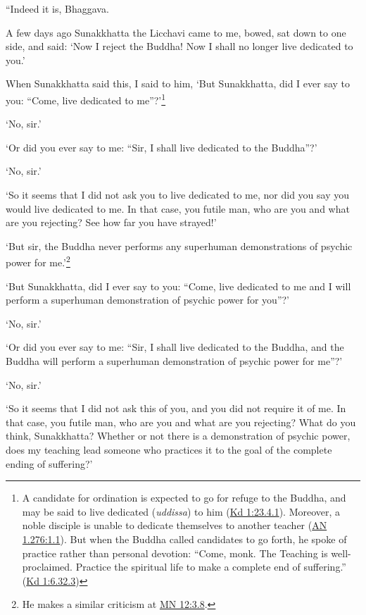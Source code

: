\documentclass[12pt,openany]{book}%
\begin{document}
“Indeed it is, Bhaggava. 

A few days ago Sunakkhatta the Licchavi came to me, bowed, sat down to one side, and said: ‘Now I reject the Buddha! Now I shall no longer live dedicated to you.’ 

When Sunakkhatta said this, I said to him, ‘But Sunakkhatta, did I ever say to you: “Come, live dedicated to me”?’\footnote{A candidate for ordination is expected to go for refuge to the Buddha, and may be said to live dedicated (\textit{uddissa}) to him (\href{https://suttacentral.net/pli-tv-kd1/en/sujato\#23.4.1}{Kd 1:23.4.1}). Moreover, a noble disciple is unable to dedicate themselves to another teacher (\href{https://suttacentral.net/an1.276/en/sujato\#1.1}{AN 1.276:1.1}). But when the Buddha called candidates to go forth, he spoke of practice rather than personal devotion: “Come, monk. The Teaching is well-proclaimed. Practice the spiritual life to make a complete end of suffering.” (\href{https://suttacentral.net/pli-tv-kd1/en/sujato\#6.32.3}{Kd 1:6.32.3}) } 

‘No, sir.’ 

‘Or did you ever say to me: “Sir, I shall live dedicated to the Buddha”?’ 

‘No, sir.’ 

‘So it seems that I did not ask you to live dedicated to me, nor did you say you would live dedicated to me. In that case, you futile man, who are you and what are you rejecting? See how far you have strayed!’ 

‘But sir, the Buddha never performs any superhuman demonstrations of psychic power for me.’\footnote{He makes a similar criticism at \href{https://suttacentral.net/mn12/en/sujato\#3.8}{MN 12:3.8}. } 

‘But Sunakkhatta, did I ever say to you: “Come, live dedicated to me and I will perform a superhuman demonstration of psychic power for you”?’ 

‘No, sir.’ 

‘Or did you ever say to me: “Sir, I shall live dedicated to the Buddha, and the Buddha will perform a superhuman demonstration of psychic power for me”?’ 

‘No, sir.’ 

‘So it seems that I did not ask this of you, and you did not require it of me. In that case, you futile man, who are you and what are you rejecting? What do you think, Sunakkhatta? Whether or not there is a demonstration of psychic power, does my teaching lead someone who practices it to the goal of the complete ending of suffering?’ 
\end{document}
